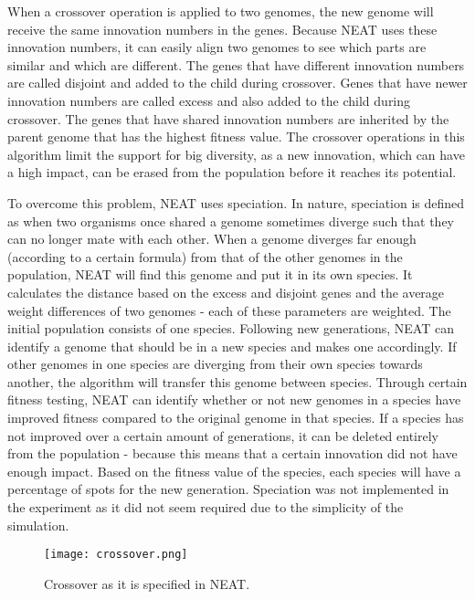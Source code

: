 When a crossover operation is applied to two genomes, the new genome will receive the same innovation numbers in the genes.
Because NEAT uses these innovation numbers, it can easily align two genomes to see which parts are similar and which are different.
The genes that have different innovation numbers are called disjoint and added to the child during crossover.
Genes that have newer innovation numbers are called excess and also added to the child during crossover.
The genes that have shared innovation numbers are inherited by the parent genome that has the highest fitness value.
The crossover operations in this algorithm limit the support for big diversity, as a new innovation, which can have a high impact, can be erased from the population before it reaches its potential.

To overcome this problem, NEAT uses speciation.
In nature, speciation is defined as when two organisms once shared a genome sometimes diverge such that they can no longer mate with each other.
When a genome diverges far enough (according to a certain formula) from that of the other genomes in the population, NEAT will find this genome and put it in its own species.
It calculates the distance based on the excess and disjoint genes and the average weight differences of two genomes - each of these parameters are weighted.
The initial population consists of one species.
Following new generations, NEAT can identify a genome that should be in a new species and makes one accordingly.
If other genomes in one species are diverging from their own species towards another, the algorithm will transfer this genome between species.
Through certain fitness testing, NEAT can identify whether or not new genomes in a species have improved fitness compared to the original genome in that species.
If a species has not improved over a certain amount of generations, it can be deleted entirely from the population - because this means that a certain innovation did not have enough impact.
Based on the fitness value of the species, each species will have a percentage of spots for the new generation.
Speciation was not implemented in the experiment as it did not seem required due to the simplicity of the simulation.

\begin{figure}[H]
\centering
\texttt{[image: crossover.png]}
\caption{Crossover as it is specified in NEAT.}
\label{fig:cross}
\end{figure}

